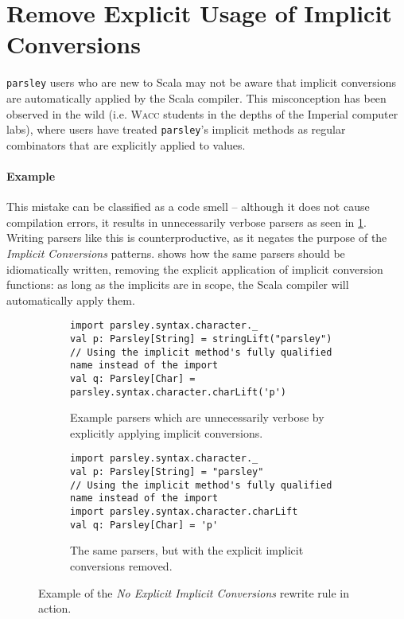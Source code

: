 \documentclass[../../main.tex]{subfiles}
\begin{document}
\section{Remove Explicit Usage of Implicit Conversions}\label{sec:no-explicit-implicits}
\texttt{parsley} users who are new to Scala may not be aware that implicit conversions are automatically applied by the Scala compiler.
This misconception has been observed in the wild (i.e. \textsc{Wacc} students in the depths of the Imperial computer labs), where users have treated \texttt{parsley}'s implicit methods as regular combinators that are explicitly applied to values.

\paragraph{Example}
This mistake can be classified as a code smell -- although it does not cause compilation errors, it results in unnecessarily verbose parsers as seen in \cref{fig:explicit-implicits-example}.
Writing parsers like this is counterproductive, as it negates the purpose of the \emph{Implicit Conversions} patterns.
 shows how the same parsers should be idiomatically written, removing the explicit application of implicit conversion functions: as long as the implicits are in scope, the Scala compiler will automatically apply them.

\begin{figure}[htbp]
\begin{subfigure}{\textwidth}
\begin{verbatim}
import parsley.syntax.character._
val p: Parsley[String] = stringLift("parsley")
// Using the implicit method's fully qualified name instead of the import
val q: Parsley[Char] = parsley.syntax.character.charLift('p')
\end{verbatim}
\caption{Example parsers which are unnecessarily verbose by explicitly applying implicit conversions.}
\label{fig:explicit-implicits-example}
\end{subfigure}
%
\begin{subfigure}{\textwidth}
\vspace{3ex}
\begin{verbatim}
import parsley.syntax.character._
val p: Parsley[String] = "parsley"
// Using the implicit method's fully qualified name instead of the import
import parsley.syntax.character.charLift
val q: Parsley[Char] = 'p'
\end{verbatim}
\caption{The same parsers, but with the explicit implicit conversions removed.}
\label{fig:explicit-implicits-rewrite}
\end{subfigure}
\caption{Example of the \emph{No Explicit Implicit Conversions} rewrite rule in action.}
\end{figure}
\end{document}
